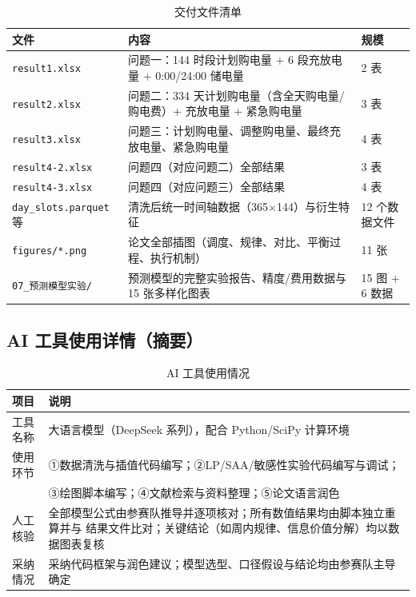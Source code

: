 \begin{table}[htbp]
\centering
\caption{交付文件清单}
\label{tab:deliver}
\begin{tabularx}{\textwidth}{@{}lLl@{}}
\toprule
文件 & 内容 & 规模 \\
\midrule
\texttt{result1.xlsx} & 问题一\nobreak：144 时段计划购电量 + 6 段充放电量 + 0:00/24:00 储电量 & 2 表 \\
\texttt{result2.xlsx} & 问题二\nobreak：334 天计划购电量（含全天购电量/购电费\nobreak）+ 充放电量 + 紧急购电量 & 3 表 \\
\texttt{result3.xlsx} & 问题三\nobreak：计划购电量\nobreak、调整购电量\nobreak、最终充放电量\nobreak、紧急购电量 & 4 表 \\
\texttt{result4-2.xlsx} & 问题四（对应问题二\nobreak）全部结果 & 3 表 \\
\texttt{result4-3.xlsx} & 问题四（对应问题三\nobreak）全部结果 & 4 表 \\
\texttt{day\_slots.parquet} 等 & 清洗后统一时间轴数据（365$\times$144\nobreak）与衍生特征 & 12 个数据文件 \\
\texttt{figures/*.png} & 论文全部插图（调度\nobreak、规律\nobreak、对比\nobreak、平衡过程\nobreak、执行机制\nobreak） & 11 张 \\
\texttt{07\_预测模型实验/} & 预测模型的完整实验报告\nobreak、精度/费用数据与 15 张多样化图表 & 15 图 $+$ 6 数据 \\
\bottomrule
\end{tabularx}
\end{table}

\subsection{AI 工具使用详情（摘要\nobreak）}

\begin{table}[htbp]
\centering
\caption{AI 工具使用情况}
\label{tab:ai}
\begin{tabularx}{\textwidth}{@{}p{3.2cm}X@{}}
\toprule
项目 & 说明 \\
\midrule
工具名称 & 大语言模型（DeepSeek 系列\nobreak）\nobreak，配合 Python/SciPy 计算环境 \\
使用环节 & ①数据清洗与插值代码编写\nobreak；②LP/SAA/敏感性实验代码编写与调试\nobreak；\\
 & ③绘图脚本编写\nobreak；④文献检索与资料整理\nobreak；⑤论文语言润色 \\
人工核验 & 全部模型公式由参赛队推导并逐项核对\nobreak；所有数值结果均由脚本独立重算并与
结果文件比对\nobreak；关键结论（如周内规律\nobreak、信息价值分解\nobreak）均以数据图表复核 \\
采纳情况 & 采纳代码框架与润色建议\nobreak；模型选型\nobreak、口径假设与结论均由参赛队主导确定 \\
\bottomrule
\end{tabularx}
\end{table}

